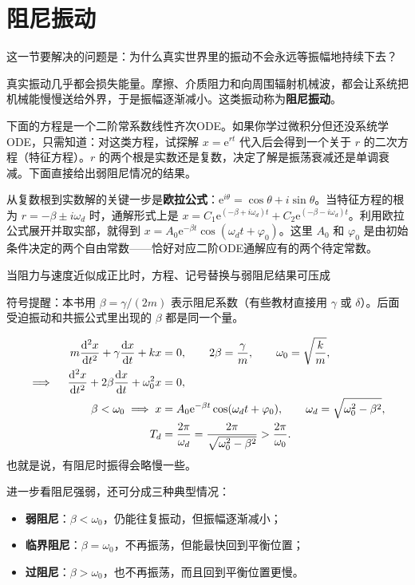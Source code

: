 \documentclass[lang=cn,11pt]{elegantbook}
\newcommand{\bridge}[1]{\begin{note}#1\end{note}}
\begin{document}
\section{阻尼振动}

这一节要解决的问题是：为什么真实世界里的振动不会永远等振幅地持续下去？

真实振动几乎都会损失能量。摩擦、介质阻力和向周围辐射机械波，都会让系统把机械能慢慢送给外界，于是振幅逐渐减小。这类振动称为\textbf{阻尼振动}。

\bridge{下面的方程是一个二阶常系数线性齐次ODE。如果你学过微积分但还没系统学ODE，只需知道：对这类方程，试探解 \(x=\mathrm{e}^{rt}\) 代入后会得到一个关于 \(r\) 的二次方程（特征方程）。\(r\) 的两个根是实数还是复数，决定了解是振荡衰减还是单调衰减。下面直接给出弱阻尼情况的结果。}

\begin{remark}
从复数根到实数解的关键一步是\textbf{欧拉公式}：\(\mathrm{e}^{i\theta}=\cos\theta+i\sin\theta\)。当特征方程的根为 \(r=-\beta\pm i\omega_d\) 时，通解形式上是 \(x=C_1\mathrm{e}^{(-\beta+i\omega_d)t}+C_2\mathrm{e}^{(-\beta-i\omega_d)t}\)。利用欧拉公式展开并取实部，就得到 \(x=A_0\mathrm{e}^{-\beta t}\cos(\omega_d t+\varphi_0)\)。这里 \(A_0\) 和 \(\varphi_0\) 是由初始条件决定的两个自由常数——恰好对应二阶ODE通解应有的两个待定常数。
\end{remark}

当阻力与速度近似成正比时，方程、记号替换与弱阻尼结果可压成

\bridge{符号提醒：本书用 \(\beta=\gamma/(2m)\) 表示阻尼系数（有些教材直接用 \(\gamma\) 或 \(\delta\)）。后面受迫振动和共振公式里出现的 \(\beta\) 都是同一个量。}
\[
\begin{aligned}
m\dv[2]{x}{t}+\gamma\dv{x}{t}+kx&=0,\qquad
2\beta=\frac{\gamma}{m},\qquad
\omega_0=\sqrt{\frac{k}{m}},\\
\implies\quad
\dv[2]{x}{t}+2\beta\dv{x}{t}+\omega_0^2x&=0,\\
\beta<\omega_0
\implies
x&=A_0\mathrm{e}^{-\beta t}\cos(\omega_d t+\varphi_0),\qquad
\omega_d=\sqrt{\omega_0^2-\beta^2},\\
T_d&=\frac{2\pi}{\omega_d}
=\frac{2\pi}{\sqrt{\omega_0^2-\beta^2}}
>\frac{2\pi}{\omega_0}.
\end{aligned}
\]
也就是说，有阻尼时振得会略慢一些。

进一步看阻尼强弱，还可分成三种典型情况：
\begin{itemize}
  \item \textbf{弱阻尼}：\(\beta<\omega_0\)，仍能往复振动，但振幅逐渐减小；
  \item \textbf{临界阻尼}：\(\beta=\omega_0\)，不再振荡，但能最快回到平衡位置；
  \item \textbf{过阻尼}：\(\beta>\omega_0\)，也不再振荡，而且回到平衡位置更慢。
\end{itemize}
\end{document}
